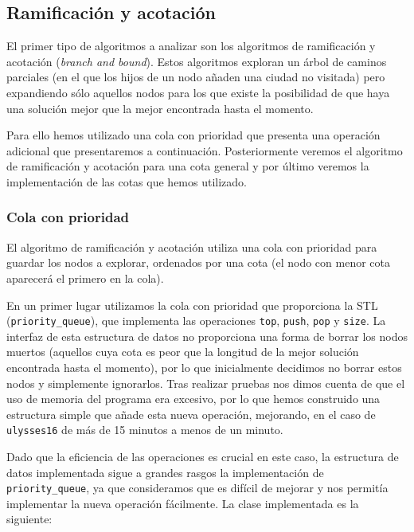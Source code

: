\subsection{Ramificación y acotación}

El primer tipo de algoritmos a analizar son los algoritmos de ramificación y acotación
(\textit{branch and bound}). Estos algoritmos exploran un árbol de caminos parciales (en el que los hijos de un nodo añaden una ciudad no visitada) pero expandiendo sólo aquellos nodos para los que existe la posibilidad de que haya una solución mejor que la mejor
encontrada hasta el momento.

Para ello hemos utilizado una cola con prioridad que presenta una operación adicional
que presentaremos a continuación. Posteriormente veremos el algoritmo de ramificación
y acotación para una cota general y por último veremos la implementación de las cotas
que hemos utilizado.

\subsubsection{Cola con prioridad}

El algoritmo de ramificación y acotación utiliza una cola con prioridad para guardar
los nodos a explorar, ordenados por una cota (el nodo con menor cota aparecerá el
primero en la cola).

En un primer lugar utilizamos la cola con prioridad que proporciona la STL (\texttt{priority\_queue}), que implementa las operaciones \texttt{top}, \texttt{push}, \texttt{pop} y \texttt{size}. La interfaz de esta estructura de datos no proporciona una forma de borrar los nodos muertos (aquellos cuya cota es peor que la longitud de la mejor solución encontrada hasta el momento), por lo que inicialmente decidimos no borrar estos nodos y simplemente ignorarlos. Tras realizar pruebas nos dimos cuenta de que el
uso de memoria del programa era excesivo, por lo que hemos construido una estructura simple que añade esta nueva operación, mejorando, en el caso de \texttt{ulysses16} de más de 15 minutos a menos de un minuto.

Dado que la eficiencia de las operaciones es crucial en este caso, la estructura de datos implementada sigue a grandes rasgos la implementación de \texttt{priority\_queue}, ya que consideramos que es difícil de mejorar y nos permitía implementar la nueva operación fácilmente. La clase implementada es la siguiente:




